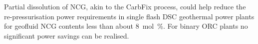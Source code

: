     Partial dissolution of NCG, akin to the CarbFix process, could help reduce the re-pressurisation power requirements in single flash \ac{DSC} geothermal power plants for geofluid \ac{NCG} contents less than about \qty{8}{\mol\percent}. For binary \ac{ORC} plants no significant power savings can be realised.

\clearpage